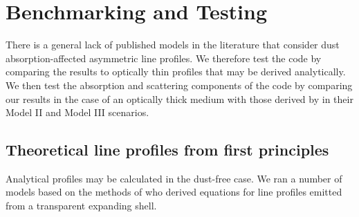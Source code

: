 \chapter{Benchmarking and Testing}\label{chp:chp3}

%
%

There is a general lack of published models in the literature that 
consider dust absorption-affected asymmetric line profiles.  We therefore test 
the code by comparing the results to optically thin profiles that may be 
derived analytically.  We then test the absorption and scattering 
components of the code by comparing our results in the case of an 
optically thick medium with those derived by \citet{Lucy1989} in their 
Model II and Model III scenarios.

\section{Theoretical line profiles from first principles}
\label{analytics}

Analytical profiles may be calculated in the dust-free case.  We ran a 
number of models based on the methods of \cite{Gerasimovic1933} 
who derived equations for line profiles emitted from a transparent 
expanding shell.


